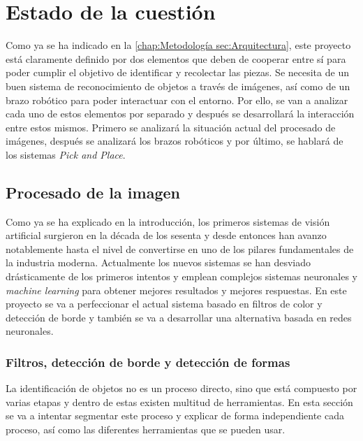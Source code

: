 \chapter{Estado de la cuestión}
\label{chap:Estado de la cuestion}

Como ya se ha indicado en la \autoref{chap:Metodología sec:Arquitectura}, este proyecto está claramente definido por dos elementos que deben de cooperar entre sí para poder cumplir el objetivo de identificar y recolectar las piezas. Se necesita de un buen sistema de reconocimiento de objetos a través de imágenes, así como de un brazo robótico para poder interactuar con el entorno. Por ello, se van a analizar cada uno de estos elementos por separado y después se desarrollará la interacción entre estos mismos. Primero se analizará la situación actual del procesado de imágenes, después se analizará los brazos robóticos y por último, se hablará de los sistemas \textit{Pick and Place}.

\section{Procesado de la imagen}
\label{chap:Estado de la cuestion sec:Procesado de la imagen}
Como ya se ha explicado en la introducción, los primeros sistemas de visión artificial surgieron en la década de los sesenta y desde entonces han avanzo notablemente hasta el nivel de convertirse en uno de los pilares fundamentales de la industria moderna. Actualmente los nuevos sistemas se han desviado drásticamente de los primeros intentos y emplean complejos sistemas neuronales y \textit{machine learning} para obtener mejores resultados y mejores respuestas. En este proyecto se va a perfeccionar el actual sistema basado en filtros de color y detección de borde y también se va a desarrollar una alternativa basada en redes neuronales.

\subsection{Filtros, detección de borde y detección de formas}
\label{chap:Estado de la cuestion sec:Procesado de la imagen subsec:Filtros, detección de borde y detección de formas}
La identificación de objetos no es un proceso directo, sino que está compuesto por varias etapas y dentro de estas existen multitud de herramientas. En esta sección se va a intentar segmentar este proceso y explicar de forma independiente cada proceso, así como las diferentes herramientas que se pueden usar.

